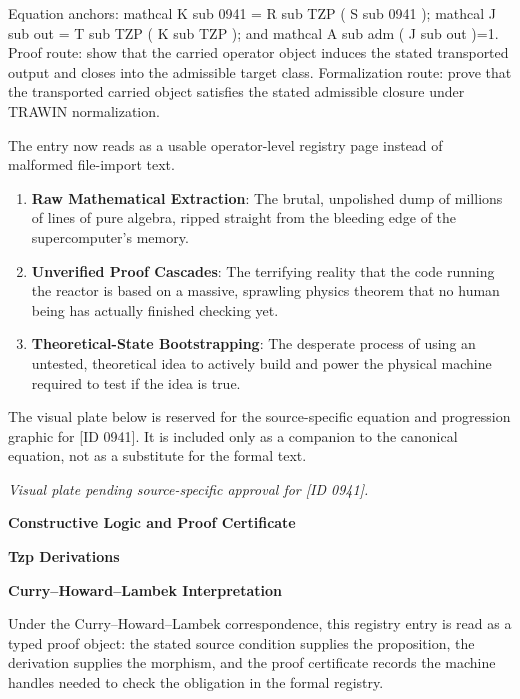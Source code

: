 Equation anchors: mathcal K sub 0941 = R sub TZP ( S sub 0941 ); mathcal J sub out = T sub TZP ( K sub TZP ); and mathcal A sub adm ( J sub out )=1. Proof route: show that the carried operator object induces the stated transported output and closes into the admissible target class. Formalization route: prove that the transported carried object satisfies the stated admissible closure under TRAWIN normalization.

The entry now reads as a usable operator-level registry page instead of malformed file-import text.
\endgroup

\begin{enumerate}[leftmargin=1.6em,itemsep=6pt,topsep=4pt]
\item \textbf{Raw Mathematical Extraction}: The brutal, unpolished dump of millions of lines of pure algebra, ripped straight from the bleeding edge of the supercomputer's memory.
\item \textbf{Unverified Proof Cascades}: The terrifying reality that the code running the reactor is based on a massive, sprawling physics theorem that no human being has actually finished checking yet.
\item \textbf{Theoretical-State Bootstrapping}: The desperate process of using an untested, theoretical idea to actively build and power the physical machine required to test if the idea is true.
\end{enumerate}

\begingroup\footnotesize\sloppy
The visual plate below is reserved for the source-specific equation and progression graphic for [ID 0941]. It is included only as a companion to the canonical equation, not as a substitute for the formal text.
\par\endgroup
\begingroup\footnotesize\itshape
Visual plate pending source-specific approval for [ID 0941].
\par\endgroup

\clearpage
\begingroup\tzpsupportsetup
\noindent\textbf{\fontsize{10.8pt}{12.8pt}\selectfont [ID 0941] Constructive Logic and Proof Certificate}\par
\noindent\textbf{\fontsize{10pt}{12pt}\selectfont Tzp Derivations}\par
\vspace{0.45em}
\begingroup
\footnotesize
\setlength{\parskip}{0.22em}
\setlength{\parindent}{0pt}
\noindent\textbf{Curry--Howard--Lambek Interpretation}\par
Under the Curry--Howard--Lambek correspondence, this registry entry is read as a typed proof
object: the stated source condition supplies the proposition, the derivation supplies the
morphism, and the proof certificate records the machine handles needed to check the obligation
in the formal registry.

